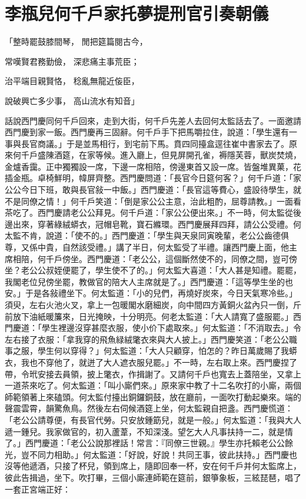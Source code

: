 %

\chapter{李瓶兒何千戶家托夢\KG 提刑官引奏朝儀}


\begin{showcontents}{}




「整時罷鼓膝間琴，  閒把筵篇閱古今，

常嘆賢君務勤儉，  深悲痛主事荒臣；

治平端目親賢恪，  稔亂無龍近侫臣，

說破興亡多少事，  高山流水有知音」

話說西門慶同何千戶回來，走到大街，何千戶先差人去回何太監話去了。一面邀請西門慶到家一飯。西門慶再三固辭。何千戶手下把馬嚼拉住，說道：「學生還有一事與長官商議。」于是並馬相行，到宅前下馬。賁四同擡盒逕往崔中書家去了。原來何千戶盛陳酒筵，在家等候。進入廳上，但見屏開孔雀，褥隱芙蓉，獸炭焚燒，金爐香靄。正中獨獨設一席，下邊一席相陪，傍邊東首又設一席。皆盤堆異菓，花插金瓶。卓椅鮮明，幃屏齊整。西門慶問道：「長官今日筵何客？」何千戶道：「家公公今日下班，敢與長官敍一中飯。」西門慶道：「長官這等費心，盛設待學生，就不是同僚之情！」何千戶笑道：「倒是家公公主意，治此粗酌，屈尊請教。」一面看茶吃了。西門慶請老公公拜見。何千戶道：「家公公便出來。」不一時，何太監從後邊出來，穿著綠絨蟒衣，冠帽皂靴，寶石縧環。西門慶展拜四拜，請公公受禮。何太監不肯，說道：「使不的。」西門慶道：「學生與天泉同寅晚輩，老公公齒德俱尊，又係中貴，自然該受禮。」講了半日，何太監受了半禮。讓西門慶上面，他主席相陪，何千戶傍坐。西門慶道：「老公公，這個斷然使不的，同僚之間，豈可傍坐？老公公叔姪便罷了，學生使不了的。」何太監大喜道：「大人甚是知禮。罷罷，我閣老位兒傍坐罷，教做官的陪大人主席就是了。」西門慶道：「這等學生坐的也安。」于是各敍禮坐下。何太監道：「小的兒們，再燒好炭來，今日天氣寒冷些。」須臾，左右火池火叉，拿上一包暖閣水磨細炭，向中間四方黃銅火盆內只一倒，斤前放下油紙暖簾來，日光掩映，十分明亮。何老太監道：「大人請寬了盛服罷。」西門慶道：「學生裡邊沒穿甚麼衣服，使小价下處取來。」何太監道：「不消取去。」令左右接了衣服：「拿我穿的飛魚緑絨氅衣來與大人披上。」西門慶笑道：「老公公職事之服，學生何以穿得？」何太監道：「大人只顧穿，怕怎的？昨日萬歲賜了我蟒衣，我也不穿他了，就迸了大人遮衣服兒罷。」不一時，左右取上來。西門慶捏了帶，令玳安接去員領，披上氅衣，作揖謝了。又請何千戶也寬去上蓋陪坐，又拿上一道茶來吃了。何太監道：「叫小廝們來。」原來家中教了十二名吹打的小廝，兩個師範領著上來磕頭。何太監付擡出銅鑼銅鼓，放在廳前，一面吹打動起樂來。端的聲震雲霄，韻驚魚鳥。然後左右伺候酒筵上坐，何太監親自把盞。西門慶慌道：「老公公請尊便，有長官代勞。只安放鍾筯兒，就是一般。」何太監道：「我與大人遞一鍾兒。我家做官的，初入蘆葦，不知深淺。望乞大人凡事扶持一二，就是情了。」西門慶道：「老公公說那裡話！常言：『同僚三世親。』學生亦托賴老公公餘光，豈不同力相助。」何太監道：「好說，好說！共同王事，彼此扶持。」西門慶也沒等他遞酒，只接了杯兒，領到席上，隨即回奉一杯，安在何千戶并何太監席上，彼此告揖過，坐下。吹打畢，三個小廝連師範在筵前，銀箏象板，三絃琵琶，唱了一套正宮端正好：


\end{showcontents}
